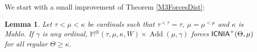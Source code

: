 \documentclass[a4paper]{amsart}
\theoremstyle{definition}
\theoremstyle{remark}
\theoremstyle{plain}
\newtheorem{mylem}[mydef]{Lemma}
\numberwithin{mydef}{section}
\DeclareMathOperator{\Add}{Add}
\DeclareMathOperator{\ICNIA}{\textup{\textsf{ICNIA}}}
\newcommand{\dM}{\mathbb{M}}
\newcommand{\dP}{\mathbb{P}}
\begin{document}
We start with a small improvement of Theorem \ref{M3ForcesDist}:

		\begin{mylem}\label{Extension}
		Let $\tau<\mu<\kappa$ be cardinals such that $\tau^{<\tau}=\tau$, $\mu=\mu^{<\mu}$ and $\kappa$ is Mahlo. If $\gamma$ is any ordinal, $\dM^\oplus(\tau,\mu,\kappa,W)\times\Add(\mu,\gamma)$ forces $\ICNIA^+(\Theta,\mu)$ for all regular $\Theta \ge \kappa$.
	\end{mylem}

	
	
\end{document}
